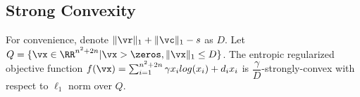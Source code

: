 \subsection{Strong Convexity}
\begin{lemma}
    \label{lemma:strongly_convex}
    For convenience, denote $\| \vr \|_1 + \| \vc \|_1 - s$ as $D$. Let $Q = \{\vx \in \RR^{n^2+2n} | \vx > \zeros,  \|\vx\|_{1} \leq D \}$. The entropic regularized objective function $f(\vx)= \sum_{i=1}^{n^2+2n} \gamma x_i log(x_i) + d_i x_i$ is $\dfrac{\gamma}{D}$-strongly-convex with respect to $\ell_1$ norm over $Q$. 
\end{lemma}
